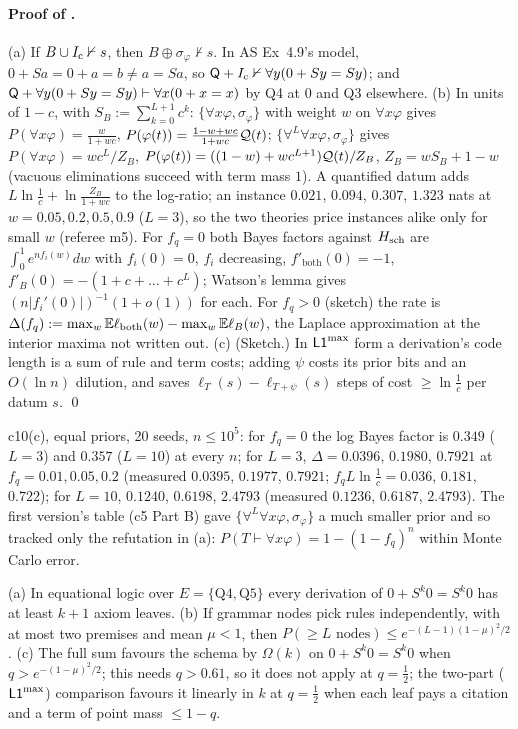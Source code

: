\paragraph{Proof of .} (a) If $B\cup I_{\mathrm{c}}\nvdash s$, then $B\oplus\sigma_\varphi\nvdash s$. In AS Ex~4.9's model, $0+Sa=0+a=b\neq a=Sa$, so $\mathsf{Q}+I_{\mathrm{c}}\nvdash\forall y(0+Sy=Sy)$; and $\mathsf{Q}+\forall y(0+Sy=Sy)\vdash\forall x(0+x=x)$ by Q4 at $0$ and Q3 elsewhere. (b) In units of $1-c$, with $S_B:=\sum_{k=0}^{L+1}c^k$: $\{\forall x\varphi,\sigma_\varphi\}$ with weight $w$ on $\forall x\varphi$ gives $P(\forall x\varphi)=\frac w{1+wc}$, $P(\varphi(t))=\frac{1-w+wc}{1+wc}\mathcal{Q}(t)$; $\{\forall^L\forall x\varphi,\sigma_\varphi\}$ gives $P(\forall x\varphi)=wc^L/Z_B$, $P(\varphi(t))=((1-w)+wc^{L+1})\mathcal{Q}(t)/Z_B$, $Z_B=wS_B+1-w$ (vacuous eliminations succeed with term mass $1$). A quantified datum adds $L\ln\frac1c+\ln\frac{Z_B}{1+wc}$ to the log-ratio; an instance $0.021$, $0.094$, $0.307$, $1.323$ nats at $w=0.05,0.2,0.5,0.9$ ($L=3$), so the two theories price instances alike only for small $w$ (referee m5). For $f_q=0$ both Bayes factors against $H_{\mathrm{sch}}$ are $\int_0^1e^{nf_i(w)}dw$ with $f_i(0)=0$, $f_i$ decreasing, $f'_{\mathrm{both}}(0)=-1$, $f'_B(0)=-(1+c+\dots+c^L)$; Watson's lemma gives $(n\lvert f_i'(0)\rvert)^{-1}(1+o(1))$ for each. For $f_q>0$ (sketch) the rate is $\Delta(f_q):=\max_w\mathbb{E}\ell_{\mathrm{both}}(w)-\max_w\mathbb{E}\ell_B(w)$, the Laplace approximation at the interior maxima not written out. (c) (Sketch.) In $\mathord{\mathsf{L1}}^{\max}$ form a derivation's code length is a sum of rule and term costs; adding $\psi$ costs its prior bits and an $O(\ln n)$ dilution, and saves $\ell_T(s)-\ell_{T+\psi}(s)$ steps of cost $\ge\ln\frac1c$ per datum $s$. \qed

c10(c), equal priors, 20 seeds, $n\le10^5$: for $f_q=0$ the log Bayes factor is $0.349$ ($L=3$) and $0.357$ ($L=10$) at every $n$; for $L=3$, $\Delta=0.0396$, $0.1980$, $0.7921$ at $f_q=0.01,0.05,0.2$ (measured $0.0395$, $0.1977$, $0.7921$; $f_qL\ln\frac1c=0.036$, $0.181$, $0.722$); for $L=10$, $0.1240$, $0.6198$, $2.4793$ (measured $0.1236$, $0.6187$, $2.4793$). The first version's table (c5 Part B) gave $\{\forall^L\forall x\varphi,\sigma_\varphi\}$ a much smaller prior and so tracked only the refutation in (a): $P(T\vdash\forall x\varphi)=1-(1-f_q)^n$ within Monte Carlo error.

\begin{proposition}\label{prop:univ:eqfrag}
\textup{(a)} In equational logic over $E=\{\text{Q4},\text{Q5}\}$ every derivation of $0+S^k0=S^k0$ has at least $k+1$ axiom leaves. \textup{(b)} If grammar nodes pick rules independently, with at most two premises and mean $\mu<1$, then $P(\ge L\text{ nodes})\le e^{-(L-1)(1-\mu)^2/2}$. \textup{(c)} The full sum favours the schema by $\Omega(k)$ on $0+S^k0=S^k0$ when $q>e^{-(1-\mu)^2/2}$; this needs $q>0.61$, so it does not apply at $q=\tfrac12$; the two-part ($\mathord{\mathsf{L1}}^{\max}$) comparison favours it linearly in $k$ at $q=\tfrac12$ when each leaf pays a citation and a term of point mass $\le1-q$.
\end{proposition}


